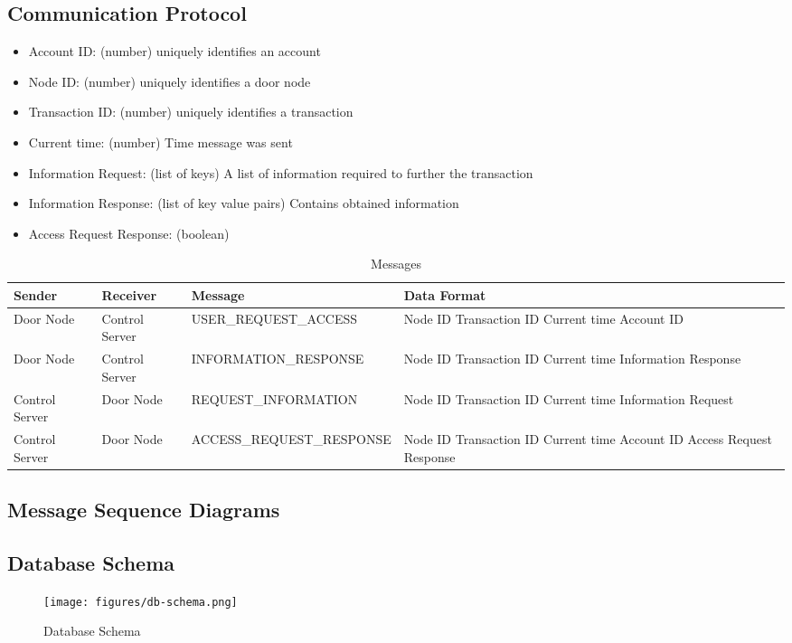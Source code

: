 \subsection{Communication Protocol}

\begin{itemize}
\item Account ID: (number) uniquely identifies an account
\item Node ID: (number) uniquely identifies a door node
\item Transaction ID: (number) uniquely identifies a transaction
\item Current time: (number) Time message was sent
\item Information Request: (list of keys) A list of information required to further the
transaction
\item Information Response: (list of key value pairs) Contains obtained information
\item Access Request Response: (boolean)
\end{itemize}

\begin{table*}[htb]
\begin{tabular}{ l | l | l | p{4.5cm} }
\toprule
Sender & Receiver & Message & Data Format\\
\midrule
Door Node & Control Server & USER\_REQUEST\_ACCESS &
Node ID \newline Transaction ID \newline Current time \newline Account ID\\
\hline
Door Node & Control Server & INFORMATION\_RESPONSE &
Node ID \newline Transaction ID \newline Current time \newline Information Response\\
\hline
Control Server & Door Node & REQUEST\_INFORMATION &
Node ID \newline Transaction ID \newline Current time \newline Information Request\\
\hline
Control Server & Door Node & ACCESS\_REQUEST\_RESPONSE &
Node ID \newline Transaction ID \newline Current time \newline Account ID \newline Access Request Response\\
\bottomrule
\end{tabular}
\caption{Messages}
\end{table*}

\subsection{Message Sequence Diagrams}

\subsection{Database Schema}

\begin{figure}[!htb]
\texttt{[image: figures/db-schema.png]}
\caption{Database Schema}
\end{figure}

